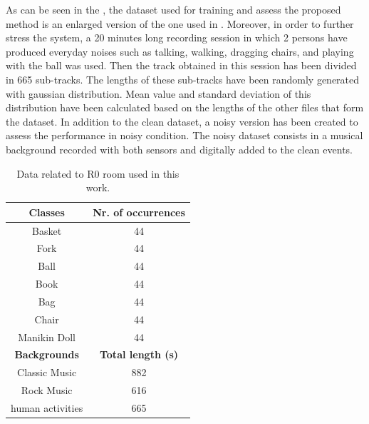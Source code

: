 As can be seen in the , the dataset used for training and assess the proposed method is an enlarged version of the one used in . Moreover, in order to further stress the system, a 20 minutes long recording session in which 2 persons have produced everyday noises such as talking, walking, dragging chairs, and playing with the ball was used. Then the track obtained in this session has been divided in 665 sub-tracks. The lengths of these sub-tracks have been randomly generated with gaussian distribution. Mean value and standard deviation of this distribution have been calculated based on the lengths of the other files that form the dataset. 
In addition to the clean dataset, a noisy version has been created to assess the performance in noisy condition. The noisy dataset consists in a musical background recorded with both sensors and digitally added to the clean events.


\begin{table}[t]
	\caption{Data related to R0 room used in this work.}
	\label{tab:binary_svm_dataset}
	\begin{center}
		\begin{tabular}[t]{c|c}
			
			\hline
			\textbf{Classes}  & \textbf{Nr. of occurrences} \\ %

			\hline
			
			Basket      			&   44    	\\
			Fork        			&   44     	\\
			Ball       				&   44    	\\
			Book        			&   44    	\\
			Bag         			&   44    	\\
			Chair       			&   44    	\\
			$\,$ Manikin Doll $\,$ 	&   44    	\\
			\hline
			\textbf{Backgrounds} & \textbf{Total length (s)}\\			
			Classic Music  			&   882   	\\
			Rock Music  			&   616   	\\
			human activities 		&   665		\\
			\hline
		\end{tabular}
	\end{center}
\end{table}

